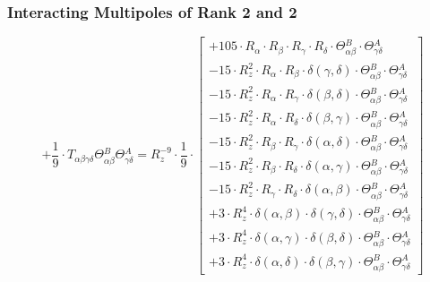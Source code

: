 \documentclass{article}
\begin{document}
\subsubsection*{Interacting Multipoles of Rank 2 and 2}
\begin{equation}
+ \frac{1}{9} \cdot T_{\alpha{}\beta{}\gamma{}\delta{}} \Theta{}^{B}_{\alpha{}\beta{}} \Theta{}^{A}_{\gamma{}\delta{}} = R_{z}^{-9} \cdot \frac{1}{9} \cdot  \left[ \begin{array}{c} 
 		+ 105 \cdot R_{\alpha{}} \cdot R_{\beta{}} \cdot R_{\gamma{}} \cdot R_{\delta{}} \cdot \Theta{}^{B}_{\alpha{}\beta{}} \cdot \Theta{}^{A}_{\gamma{}\delta{}} 
 \\[0.2em] 		 - 15 \cdot R_{z}^{2} \cdot R_{\alpha{}} \cdot R_{\beta{}} \cdot \delta{}\left(\gamma{}, \delta{}\right) \cdot \Theta{}^{B}_{\alpha{}\beta{}} \cdot \Theta{}^{A}_{\gamma{}\delta{}} 
 \\[0.2em] 		 - 15 \cdot R_{z}^{2} \cdot R_{\alpha{}} \cdot R_{\gamma{}} \cdot \delta{}\left(\beta{}, \delta{}\right) \cdot \Theta{}^{B}_{\alpha{}\beta{}} \cdot \Theta{}^{A}_{\gamma{}\delta{}} 
 \\[0.2em] 		 - 15 \cdot R_{z}^{2} \cdot R_{\alpha{}} \cdot R_{\delta{}} \cdot \delta{}\left(\beta{}, \gamma{}\right) \cdot \Theta{}^{B}_{\alpha{}\beta{}} \cdot \Theta{}^{A}_{\gamma{}\delta{}} 
 \\[0.2em] 		 - 15 \cdot R_{z}^{2} \cdot R_{\beta{}} \cdot R_{\gamma{}} \cdot \delta{}\left(\alpha{}, \delta{}\right) \cdot \Theta{}^{B}_{\alpha{}\beta{}} \cdot \Theta{}^{A}_{\gamma{}\delta{}} 
 \\[0.2em] 		 - 15 \cdot R_{z}^{2} \cdot R_{\beta{}} \cdot R_{\delta{}} \cdot \delta{}\left(\alpha{}, \gamma{}\right) \cdot \Theta{}^{B}_{\alpha{}\beta{}} \cdot \Theta{}^{A}_{\gamma{}\delta{}} 
 \\[0.2em] 		 - 15 \cdot R_{z}^{2} \cdot R_{\gamma{}} \cdot R_{\delta{}} \cdot \delta{}\left(\alpha{}, \beta{}\right) \cdot \Theta{}^{B}_{\alpha{}\beta{}} \cdot \Theta{}^{A}_{\gamma{}\delta{}} 
 \\[0.2em] 		 + 3 \cdot R_{z}^{4} \cdot \delta{}\left(\alpha{}, \beta{}\right) \cdot \delta{}\left(\gamma{}, \delta{}\right) \cdot \Theta{}^{B}_{\alpha{}\beta{}} \cdot \Theta{}^{A}_{\gamma{}\delta{}} 
 \\[0.2em] 		 + 3 \cdot R_{z}^{4} \cdot \delta{}\left(\alpha{}, \gamma{}\right) \cdot \delta{}\left(\beta{}, \delta{}\right) \cdot \Theta{}^{B}_{\alpha{}\beta{}} \cdot \Theta{}^{A}_{\gamma{}\delta{}} 
 \\[0.2em] 		 + 3 \cdot R_{z}^{4} \cdot \delta{}\left(\alpha{}, \delta{}\right) \cdot \delta{}\left(\beta{}, \gamma{}\right) \cdot \Theta{}^{B}_{\alpha{}\beta{}} \cdot \Theta{}^{A}_{\gamma{}\delta{}}
 \end{array}\right] 
\end{equation}
\end{document}
